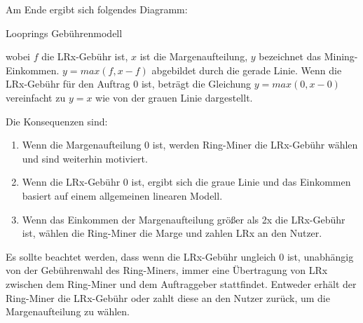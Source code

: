 \documentclass[UTF8,nofonts]{article}
\makeatletter
\newenvironment{figurehere}
 {\def\@captype{figure}}
 {}
\makeatother
\begin{document}
\begin{multicols}{2}
Am Ende ergibt sich folgendes Diagramm:

\begin{center}
\begin{figurehere}
\centering
{}
\caption{Looprings Gebührenmodell}
\label{fig:feemodel}
\end{figurehere}
\end{center}


wobei $f$ die LRx-Gebühr ist, $x$ ist die Margenaufteilung, $y$ bezeichnet das Mining-Einkommen. $y=max(f, x-f)$ abgebildet durch die gerade Linie. Wenn die LRx-Gebühr für den Auftrag $0$ ist, beträgt die Gleichung $y=max(0, x - 0)$ vereinfacht zu $y=x$ wie von der grauen Linie dargestellt.


Die Konsequenzen sind:
\begin{enumerate}
	\item Wenn die Margenaufteilung 0 ist, werden Ring-Miner die LRx-Gebühr wählen und sind weiterhin motiviert.
	\item Wenn die LRx-Gebühr 0 ist, ergibt sich die graue Linie und das Einkommen basiert auf einem allgemeinen linearen Modell.
	\item Wenn das Einkommen der Margenaufteilung größer als 2x die LRx-Gebühr ist, wählen die Ring-Miner die Marge und zahlen LRx an den Nutzer.
\end{enumerate}

Es sollte beachtet werden, dass wenn die LRx-Gebühr ungleich 0 ist, unabhängig von der Gebührenwahl des Ring-Miners, immer eine Übertragung von LRx zwischen dem Ring-Miner und dem Auftraggeber stattfindet. Entweder erhält der Ring-Miner die LRx-Gebühr oder zahlt diese an den Nutzer zurück, um die Margenaufteilung zu wählen.


\end{multicols}
\end{document}
